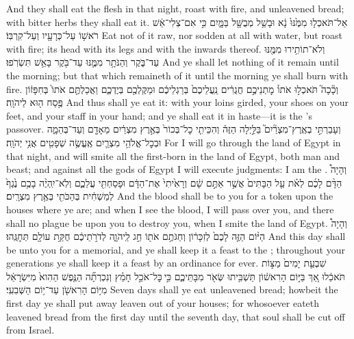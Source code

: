 \documentclass[11pt, openany]{book}
\begin{document}
{And they shall eat the flesh in that night, roast with fire, and unleavened bread; with bitter herbs they shall eat it.}
{אַל־תֹּאכְל֤וּ מִמֶּ֙נּוּ֙ נָ֔א וּבָשֵׁ֥ל מְבֻשָּׁ֖ל בַּמָּ֑יִם כִּ֣י אִם־צְלִי־אֵ֔שׁ רֹאשׁ֥וֹ עַל־כְּרָעָ֖יו וְעַל־קִרְבּֽוֹ׃}
{Eat not of it raw, nor sodden at all with water, but roast with fire; its head with its legs and with the inwards thereof.}
{וְלֹא־תוֹתִ֥ירוּ מִמֶּ֖נּוּ עַד־בֹּ֑קֶר וְהַנֹּתָ֥ר מִמֶּ֛נּוּ עַד־בֹּ֖קֶר בָּאֵ֥שׁ תִּשְׂרֹֽפוּ׃}
{And ye shall let nothing of it remain until the morning; but that which remaineth of it until the morning ye shall burn with fire.}
{וְכָ֘כָה֮ תֹּאכְל֣וּ אֹתוֹ֒ מׇתְנֵיכֶ֣ם חֲגֻרִ֔ים נַֽעֲלֵיכֶם֙ בְּרַגְלֵיכֶ֔ם וּמַקֶּלְכֶ֖ם בְּיֶדְכֶ֑ם וַאֲכַלְתֶּ֤ם אֹתוֹ֙ בְּחִפָּז֔וֹן פֶּ֥סַח ה֖וּא לַיהֹוָֽה׃}
{And thus shall ye eat it: with your loins girded, your shoes on your feet, and your staff in your hand; and ye shall eat it in haste—it is the \lord’s passover.}
{וְעָבַרְתִּ֣י בְאֶֽרֶץ־מִצְרַ֘יִם֮ בַּלַּ֣יְלָה הַזֶּה֒ וְהִכֵּיתִ֤י כׇל־בְּכוֹר֙ בְּאֶ֣רֶץ מִצְרַ֔יִם מֵאָדָ֖ם וְעַד־בְּהֵמָ֑ה וּבְכׇל־אֱלֹהֵ֥י מִצְרַ֛יִם אֶֽעֱשֶׂ֥ה שְׁפָטִ֖ים אֲנִ֥י יְהֹוָֽה׃}
{For I will go through the land of Egypt in that night, and will smite all the first-born in the land of Egypt, both man and beast; and against all the gods of Egypt I will execute judgments: I am the \lord.}
{וְהָיָה֩ הַדָּ֨ם לָכֶ֜ם לְאֹ֗ת עַ֤ל הַבָּתִּים֙ אֲשֶׁ֣ר אַתֶּ֣ם שָׁ֔ם וְרָאִ֙יתִי֙ אֶת־הַדָּ֔ם וּפָסַחְתִּ֖י עֲלֵכֶ֑ם וְלֹֽא־יִֽהְיֶ֨ה בָכֶ֥ם נֶ֙גֶף֙ לְמַשְׁחִ֔ית בְּהַכֹּתִ֖י בְּאֶ֥רֶץ מִצְרָֽיִם׃}
{And the blood shall be to you for a token upon the houses where ye are; and when I see the blood, I will pass over you, and there shall no plague be upon you to destroy you, when I smite the land of Egypt.}
{וְהָיָה֩ הַיּ֨וֹם הַזֶּ֤ה לָכֶם֙ לְזִכָּר֔וֹן וְחַגֹּתֶ֥ם אֹת֖וֹ חַ֣ג לַֽיהֹוָ֑ה לְדֹרֹ֣תֵיכֶ֔ם חֻקַּ֥ת עוֹלָ֖ם תְּחׇגֻּֽהוּ׃}
{And this day shall be unto you for a memorial, and ye shall keep it a feast to the \lord; throughout your generations ye shall keep it a feast by an ordinance for ever.}
{שִׁבְעַ֤ת יָמִים֙ מַצּ֣וֹת תֹּאכֵ֔לוּ אַ֚ךְ בַּיּ֣וֹם הָרִאשׁ֔וֹן תַּשְׁבִּ֥יתוּ שְּׂאֹ֖ר מִבָּתֵּיכֶ֑ם כִּ֣י \legarmeh  כׇּל־אֹכֵ֣ל חָמֵ֗ץ וְנִכְרְתָ֞ה הַנֶּ֤פֶשׁ הַהִוא֙ מִיִּשְׂרָאֵ֔ל מִיּ֥וֹם הָרִאשֹׁ֖ן עַד־י֥וֹם הַשְּׁבִעִֽי׃}
{Seven days shall ye eat unleavened bread; howbeit the first day ye shall put away leaven out of your houses; for whosoever eateth leavened bread from the first day until the seventh day, that soul shall be cut off from Israel.}
\end{document}
